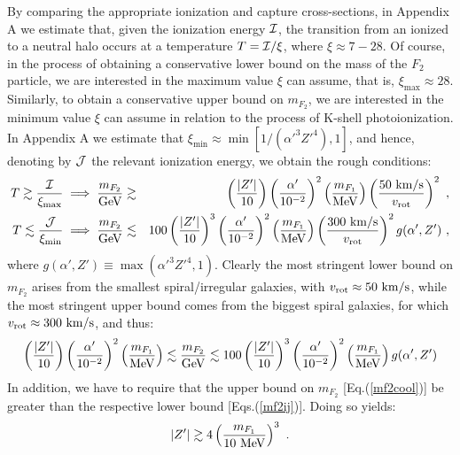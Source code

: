 \documentclass[12pt]{article}
\begin{document}
{{By comparing the appropriate ionization and capture cross-sections, in Appendix A we estimate that, given the ionization energy ${\cal I}$, the transition from an ionized to a neutral halo occurs at a temperature $T = {\cal I}/\xi$, where $\xi \approx 7-28$. Of course, in the process of obtaining a conservative lower bound on the mass of the $F_2$ particle, we are interested in the maximum value $\xi$ can assume, that is, $\xi _{\max} \approx 28$. Similarly, to obtain a conservative upper bound on $m _{F_2}$, we are interested in the minimum value $\xi$ can assume in relation to the process of K-shell photoionization. In Appendix A we estimate that $\xi _{\min} \approx \min [1/({\alpha '} ^3{Z'} ^4),1]$, and hence, denoting by ${\cal J}$ the relevant ionization energy, we obtain the rough conditions:
%
\begin{eqnarray}
T \gtrsim \frac{{\cal I}}{\xi _{\max}} \implies \frac{m _{F_2}}{\rm GeV} & \gtrsim & \left (\frac{|Z'|}{10} \right )\left (\frac{\alpha '}{10 ^{-2}} \right ) ^2\left ( \frac{m _{F_1}}{\rm MeV} \right )\left ( \frac{50 \ {\rm km/s}}{v _{\text{rot}}} \right ) ^2 \ , \nonumber \\
T \lesssim \frac{{\cal J}}{\xi _{\min}} \implies \frac{m _{F_2}}{\rm GeV} & \lesssim & 100 \left ( \frac{|Z'|}{10} \right ) ^3\left (\frac{\alpha '}{10 ^{-2}} \right ) ^2\left ( \frac{m _{F_1}}{\rm MeV} \right )\left ( \frac{300 \ {\rm km/s}}{v _{\text{rot}}} \right ) ^2g(\alpha ',Z') \ ,
\label{mf2ij}
\end{eqnarray}
%
where $g(\alpha ',Z') \equiv \max({\alpha '} ^3{Z'} ^4,1)$. Clearly the most stringent lower bound on $m _{F_2}$ arises from the smallest spiral/irregular galaxies, with $v _{\text{rot}} \approx 50 \ \rm km/s$, while the most stringent upper bound comes from the biggest spiral galaxies, for which $v _{\text{rot}} \approx 300 \ \rm km/s$, and thus:
%
\begin{eqnarray}
\left (\frac{|Z'|}{10} \right )\left (\frac{\alpha '}{10 ^{-2}} \right ) ^2\left ( \frac{m _{F_1}}{\rm MeV} \right ) \lesssim \frac{m _{F_2}}{{\rm GeV}} \lesssim 100 \left ( \frac{|Z'|}{10} \right ) ^3\left (\frac{\alpha '}{10 ^{-2}} \right ) ^2\left ( \frac{m _{F_1}}{\rm MeV} \right )g(\alpha ',Z')
\label{mf2bounds}
\end{eqnarray}
%
In addition, we have to require that the upper bound on $m _{F_2}$ [Eq.(\ref{mf2cool})] be greater than the respective lower bound [Eqs.(\ref{mf2ij})]. Doing so yields:
%
\begin{eqnarray}
|Z'| \gtrsim 4 \left ( \frac{m _{F_1}}{10 \ \rm MeV} \right ) ^3 \ .
\label{boundz}
\end{eqnarray}
%

}}
\end{document}
